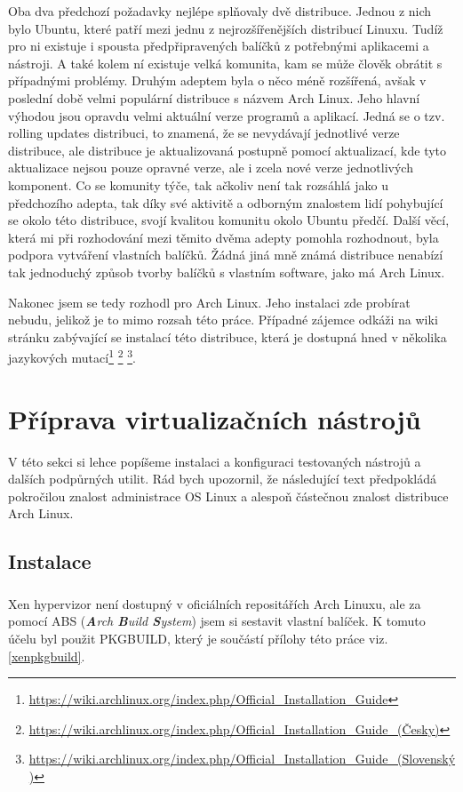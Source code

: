 Oba dva předchozí požadavky nejlépe splňovaly dvě distribuce. Jednou z nich bylo Ubuntu, které patří mezi jednu z nejrozšířenějších distribucí Linuxu. Tudíž pro ni existuje i spousta předpřipravených balíčků z potřebnými aplikacemi a nástroji. A také kolem ní existuje velká komunita, kam se může člověk obrátit s případnými problémy. Druhým adeptem byla o něco méně rozšířená, avšak v poslední době velmi populární distribuce s názvem Arch Linux. Jeho hlavní výhodou jsou opravdu velmi aktuální verze programů a aplikací. Jedná se o tzv. rolling updates distribuci, to znamená, že se nevydávají jednotlivé verze distribuce, ale distribuce je aktualizovaná postupně pomocí aktualizací, kde tyto aktualizace nejsou pouze opravné verze, ale i zcela nové verze jednotlivých komponent. Co se komunity týče, tak ačkoliv není tak rozsáhlá jako u předchozího adepta, tak díky své aktivitě a odborným znalostem lidí pohybující se okolo této distribuce, svojí kvalitou komunitu okolo Ubuntu předčí. Další věcí, která mi při rozhodování mezi těmito dvěma adepty pomohla rozhodnout, byla podpora vytváření vlastních balíčků. Žádná jiná mně známá distribuce nenabízí tak jednoduchý způsob tvorby balíčků s vlastním software, jako má Arch Linux.

Nakonec jsem se tedy rozhodl pro Arch Linux. Jeho instalaci zde probírat nebudu, jelikož je to mimo rozsah této práce. Případné zájemce odkáži na wiki stránku zabývající se instalací této distribuce, která je dostupná hned v několika jazykových mutací\footnote{\url{https://wiki.archlinux.org/index.php/Official\_Installation\_Guide}}
\footnote{\url{https://wiki.archlinux.org/index.php/Official\_Installation\_Guide\_(Česky)}}
\footnote{\url{https://wiki.archlinux.org/index.php/Official\_Installation\_Guide\_(Slovenský)}}.

 

\section{Příprava virtualizačních nástrojů}
V této sekci si lehce popíšeme instalaci a konfiguraci testovaných nástrojů a dalších podpůrných utilit. Rád bych upozornil, že následující text předpokládá pokročilou znalost administrace OS Linux a alespoň částečnou znalost distribuce Arch Linux.
\subsection{Instalace}
\subsubsection{\xen}
Xen hypervizor není dostupný v oficiálních repositářích Arch Linuxu, ale za pomocí ABS (\emph{\textbf{A}rch \textbf{B}uild \textbf{S}ystem}) jsem si sestavit vlastní balíček. K tomuto účelu byl použit PKGBUILD, který je součástí přílohy této práce viz. \ref{xenpkgbuild}.

